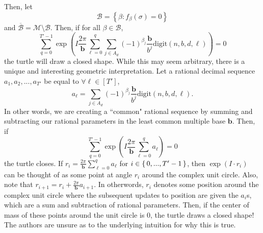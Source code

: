 \documentclass[11pt,titlepage]{article}
\newcommand{\rationalPeriodTotal}{{T}'}
\newcommand{\commonBase}{{\pmb{b}}}
\newcommand{\numbToCommon}{\frac{\commonBase}{b^j}}
\newcommand{\commonToAngle}{\frac{2\pi}{\commonBase}}
\begin{document}
Then, let
$$
  \mathcal{B} = \left\{\beta: f_\beta(\sigma) = 0\right\}
$$
and $\overline{\mathcal{B}} = \mathcal{M} \setminus \mathcal{B}$. Then, if for all
$\beta \in \mathcal{B}$,
$$
\sum_{q = 0}^{\rationalPeriodTotal - 1}
  \exp\left(
      I 
      \commonToAngle 
      \sum_{\ell = 0}^{q}
      \sum_{j \in A_d}
          \left(-1\right) ^ {\beta_{j}}
          \numbToCommon
          \mathrm{digit}(n, b, d, \ell)
  \right) = 0
$$
the turtle will draw a closed shape. While this may seem arbitrary, there is a unique
and interesting geometric interpretation. 
Let a rational decimal sequence $a_1, a_2, ..., a_{\rationalPeriodTotal}$ be equal to
$
\forall \ell \in [\rationalPeriodTotal]
$,
$$
a_\ell = \sum_{j \in A_d}
\left(-1\right) ^ {\beta_{j}}
\numbToCommon
\mathrm{digit}(n, b, d, \ell).
$$
In other words, we are creating a ``common" rational sequence by summing and subtracting
our rational parameters in the least common multiple base $\commonBase$. Then,
if $$
\sum_{q = 0}^{\rationalPeriodTotal - 1}
\exp\left(
    I 
    \commonToAngle 
    \sum_{\ell = 0}^{q}
      a_\ell
  \right) = 0
$$
the turtle closes.
If $r_i = \commonToAngle \sum_{\ell = 0}^{q} a_\ell$ for 
$i \in \set{0, ..., \rationalPeriodTotal - 1}$, then $\exp(I \cdot r_i)$ can be thought of as some point at angle $r_i$ around the 
complex unit circle. Also, note that $r_{i + 1} = r_i + \commonToAngle a_{i+1}$. In otherwords,
$r_i$ denotes some position around the complex unit circle where the subsequent updates
to position are given the $a_i$s, which are a sum and subtraction of rational parameters. Then, if the center of
mass of these points around the unit circle is $0$, the turtle draws a closed shape!
The authors are unsure as to the underlying intuition for why this is true.

\end{document}
